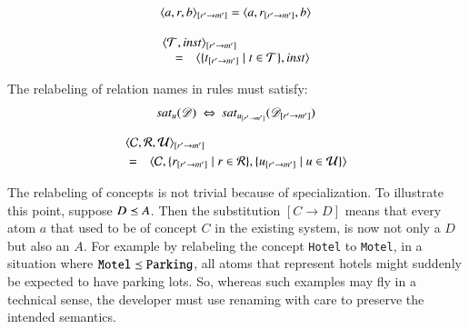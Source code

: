 \documentclass{elsarticle}
\begin{document}
\begin{definition}
   \[\subst{r'}{m'}{\triple{a}{r}{b}} = \triple{a}{\subst{r'}{m'}{r}}{b}\]
\end{definition}
\begin{definition}
   \[\begin{array}{rcl}
      \rlap{$\subst{r'}{m'}{\pair{\triples}{\inst}}$}\\
      &=&\pair{\{\subst{r'}{m'}{t}\mid t\in\triples\}}{\inst}
   \end{array}\]
\end{definition}
   The relabeling of relation names in rules must satisfy:
\begin{equation}
   \sat{u}{\dataset}\ \Leftrightarrow\ \sat{\subst{r'}{m'}{u}}{\subst{r'}{m'}{\dataset}}
\end{equation}
\begin{definition}
   \begin{eqnarray}
      \rlap{$\subst{r'}{m'}{\triple{\concepts}{\rels}{\rules}}$}\notag\\
      &=&\triple{\concepts}{\{\subst{r'}{m'}{r} \mid r\in\rels\}}{\{\subst{r'}{m'}{u} \mid u\in\rules\}}\notag
   \end{eqnarray}
\end{definition}
   
   The relabeling of concepts is not trivial because of specialization.
   To illustrate this point, suppose $D\isa A$.
   Then the substitution $[C\rightarrow D]$ means that every atom $a$ that used to be of concept $C$ in the existing system, is now not only a $D$ but also an $A$.
   For example by relabeling the concept {\tt Hotel} to {\tt Motel}, in a situation where ${\tt Motel}\isa{\tt Parking}$,
   all atoms that represent hotels might suddenly be expected to have parking lots.
   So, whereas such examples may fly in a technical sense, the developer must use renaming with care to preserve the intended semantics.
\end{document}

